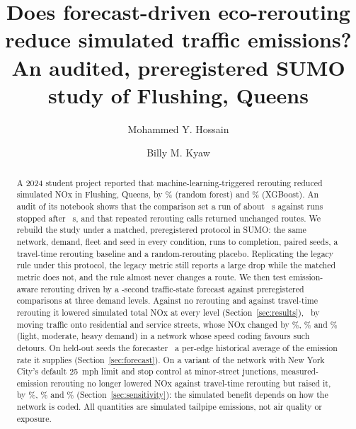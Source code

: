 \documentclass[11pt]{article}
\title{Does forecast-driven eco-rerouting reduce simulated traffic emissions?\\
\large An audited, preregistered SUMO study of Flushing, Queens}
\author{Mohammed Y. Hossain \and Billy M. Kyaw}
\date{}
\begin{document}
\maketitle

\begin{abstract}
A 2024 student project reported that machine-learning-triggered rerouting reduced simulated NOx in Flushing,
Queens, by \LegacyNOxDropRF\% (random forest) and \LegacyNOxDropXGB\% (XGBoost). An audit of its notebook shows
that the comparison set a run of about \LegacyBaselineHorizon~s against runs stopped after
\LegacyControlledSteps~s, and that repeated rerouting calls returned unchanged routes. We rebuild the study under a
matched, preregistered protocol in SUMO: the same network, demand, fleet and seed in every condition, runs to
completion, paired seeds, a travel-time rerouting baseline and a random-rerouting placebo. Replicating the legacy
rule under this protocol, the legacy metric still reports a large drop while the matched metric does not, and the
rule almost never changes a route. We then test emission-aware rerouting driven by a \HorizonS-second traffic-state
forecast against preregistered comparisons at three demand levels. Against no rerouting and against travel-time
rerouting it lowered simulated total NOx at every level (Section~\ref{sec:results}), \CompositionWord\ by moving
traffic onto residential and service streets, whose NOx changed by \ResidNOxLight\%, \ResidNOxModerate\% and
\ResidNOxHeavy\% (light, moderate, heavy demand) in a network whose speed coding favours such detours. On held-out
seeds the forecaster \ForecastVerdictR\ a per-edge historical average of the emission rate it supplies
(Section~\ref{sec:forecast}). On a variant of the network with New York City's default 25~mph limit and stop control
at minor-street junctions, measured-emission rerouting no longer lowered NOx against travel-time rerouting but raised
it, by \SensEcoReactiveVsTtAdaptiveTotalNoxGLightPosted\%, \SensEcoReactiveVsTtAdaptiveTotalNoxGModeratePosted\% and
\SensEcoReactiveVsTtAdaptiveTotalNoxGHeavyPosted\% (Section~\ref{sec:sensitivity}): the simulated benefit depends on
how the network is coded. All
quantities are simulated tailpipe emissions, not air quality or exposure.
\end{abstract}
\end{document}
